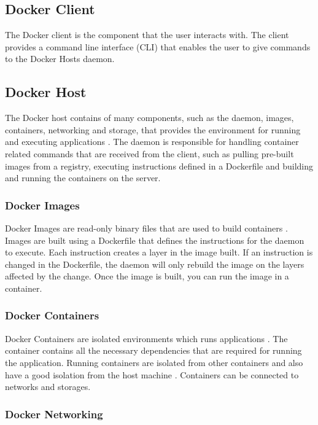 \documentclass[fleqn,12pt]{olplainarticle}
\begin{document}
\subsection{Docker Client}

The Docker client is the component that the user interacts with. The client provides a command line interface (CLI) that enables the user to give commands to the Docker Hosts daemon.

\subsection{Docker Host}

The Docker host contains of many components, such as the daemon, images, containers, networking and storage, that provides the environment for running and executing applications \citep{aquasec:docker_architecture}. The daemon is responsible for handling container related commands that are received from the client, such as pulling pre-built images from a registry, executing instructions defined in a Dockerfile and building and running the containers on the server.

\subsubsection{Docker Images}

Docker Images are read-only binary files that are used to build containers \citep{docker:overview}. Images are built using a Dockerfile that defines the instructions for the daemon to execute. Each instruction creates a layer in the image built. If an instruction is changed in the Dockerfile, the daemon will only rebuild the image on the layers affected by the change. Once the image is built, you can run the image in a container.

\subsubsection{Docker Containers}

Docker Containers are isolated environments which runs applications \citep{aquasec:docker_architecture}. The container contains all the necessary dependencies that are required for running the application. Running containers are isolated from other containers and also have a good isolation from the host machine \citep{docker:security}. Containers can be connected to networks and storages.

\subsubsection{Docker Networking}
\end{document}
